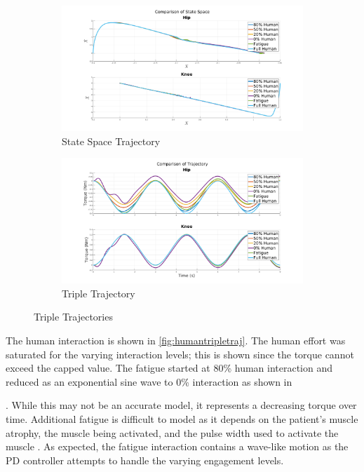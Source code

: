 \begin{figure}
    \centering
    \begin{subfigure}{\linewidth}
        \centering
        \includegraphics[width=\columnwidth]{images/controllers/trajs/statespace.png}
        \caption[State Space Trajectory]{State Space Trajectory}
        \label{fig:StateSpaceTrajectory}
    \end{subfigure}
    \begin{subfigure}{\linewidth}
        \centering
        \includegraphics[width=\columnwidth]{images/controllers/trajs/triple_traj.png}
        \caption[Triple Trajectory]{Triple Trajectory}
        \label{fig:TripleTrajectory}
    \end{subfigure}
    \caption[Triple Trajectory LARRE]{Triple Trajectories}
    \label{fig:TripleTraj}
\end{figure}



The human interaction is shown in \autoref{fig:humantripletraj}. The human effort was saturated for the varying interaction levels; this is shown since the torque cannot exceed the capped value. The fatigue started at 80\% human interaction and reduced as an exponential sine wave to 0\% interaction as shown in \author{fig:fatprofile}. While this may not be an accurate model, it represents a decreasing torque over time. Additional fatigue is difficult to model as it depends on the patient's muscle atrophy, the muscle being activated, and the pulse width used to activate the muscle \cite{reiner1998patient}. As expected, the fatigue interaction contains a wave-like motion as the PD controller attempts to handle the varying engagement levels. 


